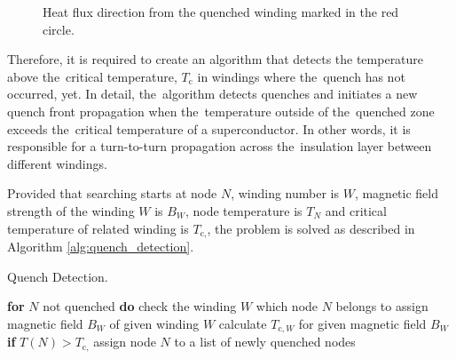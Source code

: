 \begin{figure}[H]
    \caption{Heat flux direction from the quenched winding marked in the red circle.}
    \label{fig: quench_propagation_heat_flux}
\end{figure}

Therefore, it is required to create an algorithm that detects the temperature above the~critical temperature, $T_\text{c}$ in windings where the~quench has not occurred, yet. In detail, the~algorithm detects quenches and initiates a new quench front propagation when the~temperature outside of the~quenched zone exceeds the~critical temperature of a superconductor. In other words, it is responsible for a turn-to-turn propagation across the~insulation layer between different windings.

Provided that searching starts at node $N$, winding number is $W$, magnetic field strength of the winding $W$ is $B_W$, node temperature is $T_N$ and critical temperature of related winding is $T_{\text{c},}$, the problem is solved as described in Algorithm \ref{alg:quench_detection}.

\begin{algorithm}[H]
    \caption{Quench Detection.}
    \label{alg:quench_detection}
    \begin{algorithmic}[1]
    \STATE \textbf{for} $N$ not quenched \textbf{do}
    \STATE \hspace{0.5cm} check the winding $W$ which node $N$ belongs to
    \STATE \hspace{0.5cm} assign magnetic field $B_W$ of given winding $W$
    \STATE \hspace{0.5cm} calculate $T_{\text{c},W}$ for given magnetic field $B_W$
    \STATE \hspace{0.5cm} \textbf{if} $T(N) > T_{\text{c},}$
    \STATE \hspace{1.0cm} assign node $N$ to a list of newly quenched nodes
    \end{algorithmic}
\end{algorithm}